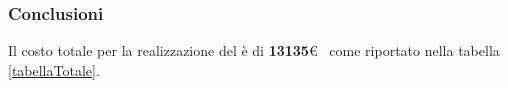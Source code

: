 \FloatBarrier
\subsubsection{Conclusioni}
Il costo totale per la realizzazione del  è di \textbf{13135}\euro~ come riportato nella tabella \ref{tabellaTotale}.
